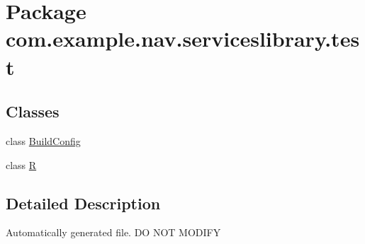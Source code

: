 \hypertarget{namespacecom_1_1example_1_1nav_1_1serviceslibrary_1_1test}{}\section{Package com.\+example.\+nav.\+serviceslibrary.\+test}
\label{namespacecom_1_1example_1_1nav_1_1serviceslibrary_1_1test}
\subsection*{Classes}
\begin{DoxyCompactItemize}
\item 
class \hyperlink{classcom_1_1example_1_1nav_1_1serviceslibrary_1_1test_1_1_build_config}{Build\+Config}
\item 
class \hyperlink{classcom_1_1example_1_1nav_1_1serviceslibrary_1_1test_1_1_r}{R}
\end{DoxyCompactItemize}


\subsection{Detailed Description}
Automatically generated file. DO N\+OT M\+O\+D\+I\+FY 